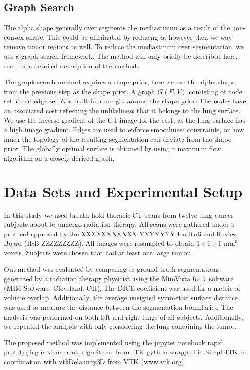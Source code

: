 \documentclass{llncs}
\begin{document}
\subsection{Graph Search}
%
The alpha shape generally over segments the mediastinum as a result of the non-convex shape. This could be eliminated by reducing $\alpha$, however then we way remove tumor regions as well. To reduce the mediastinum over segmentation, we use a graph search framework. The method will only briefly be described here, see~\cite{li2006} for a detailed description of the method. 

The graph search method requires a shape prior, here we use the alpha shape from the previous step as the shape prior. A graph $G(E,V)$ consisting of node set $V$ and edge set $E$ is built in a margin around the shape prior. The nodes have an associated cost reflecting the unlikeliness that it belongs to the lung surface. We use the inverse gradient of the CT image for the cost, as the lung surface has a high image gradient. Edges are used to enforce smoothness constraints, or how much the topology of the resulting segmentation can deviate from the shape prior. The globally optimal surface is obtained by using a maximum flow algorithm on a closely derived graph. 
 

%
\section{Data Sets and Experimental Setup}
%
In this study we used breath-hold thoracic CT scans from twelve lung cancer subjects about to undergo radiation therapy. All scans were gathered under a protocol approved by the 
XXXXXXXXXXX YYYYYYY 
Institutional Review Board 
(IRB ZZZZZZZZZ).
All images were resampled to obtain $1\times{}1\times{}1$ mm$^3$ voxels. Subjects were chosen that had at least one large tumor. 

Out method was evaluated by comparing to ground truth segmentations generated by a radiation therapy physicist using the MimVista 6.4.7 software (MIM Software, Cleveland, OH). The DICE coefficient was used for a metric of volume overlap. Additionally, the average unsigned symmetric surface distance was used to measure the distance between the segmentation boundaries. The analysis was performed on both left and right lungs of all subjects. Additionally, we repeated the analysis with only considering the lung containing the tumor.


The proposed method was implemented using the jupyter notebook \cite{PER-GRA:2007} rapid prototyping environment,  algorithms from ITK\cite{johnson2015itk} python wrapped in SimpleITK \cite{10.3389/fninf.2013.00045} in coordination with vtkDelaunay3D from VTK (www.vtk.org).
\end{document}
